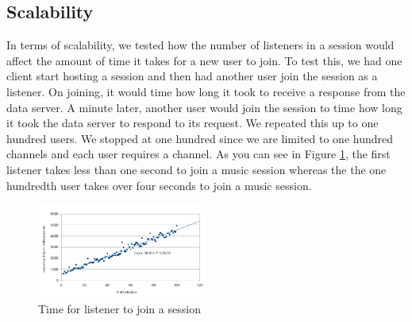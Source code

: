 \subsection{Scalability}
In terms of scalability, we tested how   
the number of listeners in a session 
would affect the amount of time it takes 
for a new user to join. 
To test this, we had one client start hosting a session and then had 
another user join the session as a listener. On joining, it would time 
how long it took to receive a response from the data server. 
A minute later, another user would 
join the session to time how long it took the data server to respond to its request. 
We repeated this up to one hundred 
users. We stopped at one hundred  since we are limited to one hundred channels
and each user requires a channel. As you can see in Figure \ref{fig:addListenersJoinTime}, 
the first listener takes less than one second to join a music session 
whereas the the one hundredth user takes over four seconds to join a music session.  

\begin{figure}[h]
	\centering
	\includegraphics[width=0.5\textwidth]{add_listeners_response_time.png}
	\caption{Time for listener to join a session}
	\label{fig:addListenersJoinTime}
\end{figure}
